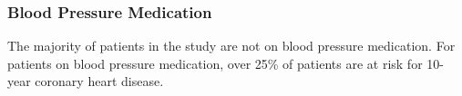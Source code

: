 \documentclass[10pt]{article}
\begin{document}
\begin{figure}[hbt!]
\hspace*{\fill}
\centering
{}\hspace{2em}%
%
\hspace*{\fill}
\end{figure}


\subsubsection*{Blood Pressure Medication}

The majority of patients in the study are not on blood pressure medication. For patients on blood pressure medication, over 25\% of patients are at risk for 10-year coronary heart disease.

\begin{figure}[hbt!]
\hspace*{\fill}
\centering
{}\hspace{2em}%
%
\hspace*{\fill}
\end{figure}
\end{document}
